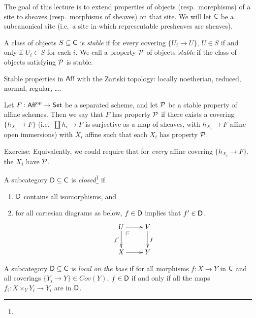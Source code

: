 
The goal of this lecture is to extend properties of objects (resp.~morephisms) of a site to sheaves (resp.~morphisms of sheaves) on that site. We will let $\C$ be a subcanonical site (i.e.~a site in which representable presheaves are sheaves).
\begin{definition}
 A class of objects $S\subseteq \C$ is \emph{stable} if for every covering $\{U_i\to U\}$, $U\in S$ if and only if $U_i\in S$ for each $i$. We call a property $\P$ of objects \emph{stable} if the class of objects satisfying $\P$ is stable.
\end{definition}
\begin{example}
 Stable properties in $\aff$ with the Zariski topology: locally noetherian, reduced, normal, regular, \dots.
\end{example}
\begin{definition}
 Let $F:\aff^{op}\to \set$ be a separated scheme, and let $\P$ be a stable property of affine schemes. Then we say that $F$ has property $\P$ if there exists a covering $\{h_{X_i}\to F\}$ (i.e.~$\coprod h_i\to F$ is surjective as a map of sheaves, with $h_{X_i}\to F$ affine open immersions) with $X_i$ affine such that each $X_i$ has property $\P$.
\end{definition}
\begin{remark}
 Exercise: Equivalently, we could require that for \emph{every} affine covering $\{h_{X_i}\to F\}$,  the $X_i$ have $\P$.
\end{remark}
\begin{definition}
 A subcategory $\D\subseteq \C$ is \emph{closed}\footnote{} if
 \begin{enumerate}
  \item $\D$ contains all isomorphisms, and
  \item for all cartesian diagrams as below, $f\in \D$ implies that $f'\in \D$.
  \[\xymatrix{
   U \ar[d]_{f'} \ar[r] \ar@{}[dr]|(.25){\pb} & V\ar[d]^f\\
   X\ar[r] & Y
  }\]
 \end{enumerate}
\end{definition}
\begin{definition}
 A subcategory $\D\subseteq \C$ is \emph{local on the base} if for all morphisms $f:X\to Y$ in $\C$ and all coverings $\{Y_i\to Y\}\in Cov(Y)$, $f\in \D$ if and only if all the maps $f_i:X\times_Y Y_i\to Y_i$ are in $\D$. 
\end{definition}
